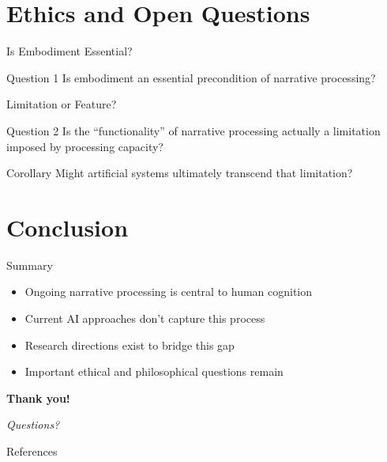 \documentclass[aspectratio=169]{beamer}
\begin{document}
\section{Ethics and Open Questions}

\begin{frame}{Is Embodiment Essential?}
  \begin{block}{Question 1}
    Is embodiment an essential precondition of narrative processing?
  \end{block}
  
\end{frame}

\begin{frame}{Limitation or Feature?}
  \begin{block}{Question 2}
    Is the ``functionality'' of narrative processing actually a limitation imposed by processing capacity?
  \end{block}
  
  \pause
  
  \begin{block}{Corollary}
    Might artificial systems ultimately transcend that limitation?
  \end{block}
  
\end{frame}

\section{Conclusion}

\begin{frame}{Summary}
  \begin{itemize}
    \item Ongoing narrative processing is central to human cognition
    \item Current AI approaches don't capture this process
    \item Research directions exist to bridge this gap
    \item Important ethical and philosophical questions remain
  \end{itemize}
  
  \vspace{1em}
  
  \centering
  \textbf{Thank you!}
  
  \vspace{0.5em}
  
  \textit{Questions?}
\end{frame}


\begin{frame}[allowframebreaks]{References}
  \printbibliography
\end{frame}
\end{document}
